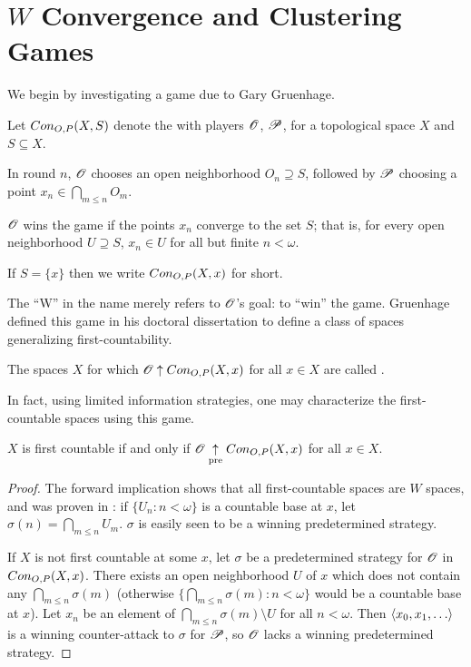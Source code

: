 
\chapter{$W$ Convergence and Clustering Games}

We begin by investigating a game due to Gary Gruenhage.

\begin{game}
  Let $Con_{O,P}(X,S)$ denote the  with
  players $\mathscr{O}$, $\mathscr{P}$, for a topological space $X$ and $S\subseteq X$.

  In round $n$, $\mathscr{O}$ chooses an open neighborhood $O_n\supseteq S$, followed
  by $\mathscr{P}$ choosing a point $x_n\in \bigcap_{m\leq n}O_m$.

  $\mathscr{O}$ wins the game if the points $x_n$ converge to the set $S$; that is,
  for every open neighborhood $U\supseteq S$, $x_n\in U$ for
  all but finite $n<\omega$.

  If $S=\{x\}$ then we write $Con_{O,P}(X,x)$ for short.
\end{game}

The ``W'' in the name merely refers to $\mathscr{O}$'s goal: to ``win'' the game.
Gruenhage defined this game in his doctoral dissertation to define a class
of spaces generalizing first-countability. \cite{MR0413049}

\begin{defn}
  The spaces $X$ for which $\mathscr{O} \uparrow Con_{O,P}(X,x)$ for all $x\in X$ are
  called .
\end{defn}

In fact, using limited information strategies, one may characterize the
first-countable spaces using this game.

\begin{prop}
  $X$ is first countable
    if and only if
  $\mathscr{O} \underset{\text{pre}}{\uparrow} Con_{O,P}(X,x)$ for all $x\in X$.
\end{prop}

\begin{proof}
  The forward implication shows that all first-countable spaces are $W$ spaces,
  and was proven in \cite{MR0413049}: if $\{U_n:n<\omega\}$ is a countable
  base at $x$, let $\sigma(n)=\bigcap_{m\leq n} U_m$. $\sigma$ is easily seen
  to be a winning predetermined strategy.

  If $X$ is not first countable at some $x$, let $\sigma$ be a
  predetermined strategy for $\mathscr{O}$ in $Con_{O,P}(X,x)$. There exists
  an open neighborhood $U$ of $x$ which does not contain any
  $\bigcap_{m\leq n}\sigma(m)$ (otherwise
  $\{\bigcap_{m\leq n}\sigma(m):n<\omega\}$ would be a countable base at $x$).
  Let $x_n$ be an element of $\bigcap_{m\leq n}\sigma(m)\setminus U$ for all
  $n<\omega$. Then $\<x_0,x_1,\dots\>$ is a winning counter-attack to $\sigma$
  for $\mathscr{P}$, so $\mathscr{O}$ lacks a winning predetermined strategy.
\end{proof}

